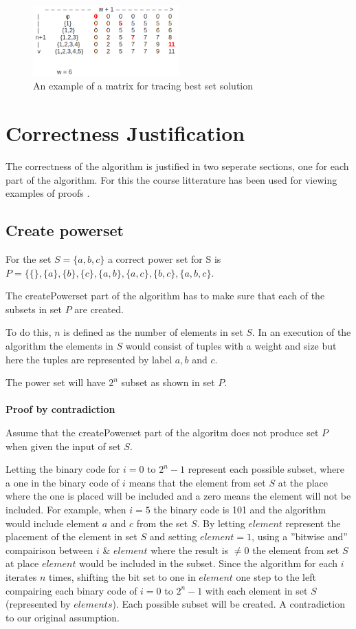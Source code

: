 \documentclass{inc/mas}
\begin{document}
\begin{figure}[h!]
  \centering
      \includegraphics[width=0.5\textwidth]{marked_matrix.png}
  \caption{An example of a matrix for tracing best set solution }
  \label{marked_matrix}
\end{figure}


\section{Correctness Justification}

The correctness of the algorithm is justified in two seperate sections, one for each part of the algorithm. For this the course litterature has been used for viewing examples of proofs \citep{Tardos}.

\subsection{Create powerset}
For the set $S = \{a,b,c\}$ a correct power set for S is $P = \{\{\},\{a\},\{b\},\{c\},\{a,b\},\{a,c\},\{b,c\},\{a,b,c\}$.

The createPowerset part of the algorithm has to make sure that each of the subsets in set $P$ are created. 

To do this, $n$ is defined as the number of elements in set $S$. In an execution of the algorithm the elements in $S$ would consist of tuples with a weight and size but here the tuples are represented by label $a,b$ and $c$.

The power set will have $2^n$ subset as shown in set $P$.\\\\

\textbf{Proof by contradiction}

Assume that the createPowerset part of the algoritm does not produce set $P$ when given the input of set $S$.

Letting the binary code for $i = 0$ to $2^n-1$ represent each possible subset, where a one in the binary code of $i$ means that the element from set $S$ at the place where the one is placed will be included and a zero means the element will not be included. For example, when $i = 5$ the binary code is 101 and the algorithm would include element $a$ and $c$ from the set $S$. By letting $element$ represent the placement of the element in set $S$ and setting $element = 1$, using a ''bitwise and'' compairison between $i$ \& $element$ where the result is $\neq0$ the element from set $S$ at place $element$ would be included in the subset. Since the algorithm for each $i$ iterates $n$ times, shifting the bit set to one in $element$ one step to the left compairing each binary code of $i = 0$ to $2^n-1$ with each element in set $S$ (represented by $elements$). Each possible subset will be created. A contradiction to our original assumption.
\end{document}
